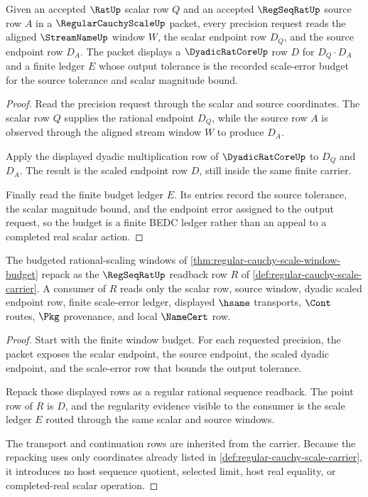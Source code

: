 \begin{theorem}
\label{thm:regular-cauchy-scale-window-budget}
Given an accepted $\RatUp$ scalar row $Q$ and an accepted $\RegSeqRatUp$ source row $A$ in a $\RegularCauchyScaleUp$ packet, every precision request reads the aligned $\StreamNameUp$ window $W$, the scalar endpoint row $D_Q$, and the source endpoint row $D_A$. The packet displays a $\DyadicRatCoreUp$ row $D$ for $D_Q \cdot D_A$ and a finite ledger $E$ whose output tolerance is the recorded scale-error budget for the source tolerance and scalar magnitude bound.
\end{theorem}
\begin{proof}
Read the precision request through the scalar and source coordinates. The scalar row $Q$ supplies the rational endpoint $D_Q$, while the source row $A$ is observed through the aligned stream window $W$ to produce $D_A$.

Apply the displayed dyadic multiplication row of $\DyadicRatCoreUp$ to $D_Q$ and $D_A$. The result is the scaled endpoint row $D$, still inside the same finite carrier.

Finally read the finite budget ledger $E$. Its entries record the source tolerance, the scalar magnitude bound, and the endpoint error assigned to the output request, so the budget is a finite BEDC ledger rather than an appeal to a completed real scalar action.
\end{proof}

\begin{theorem}
\label{thm:regular-cauchy-scale-regseqrat-handoff}
The budgeted rational-scaling windows of \autoref{thm:regular-cauchy-scale-window-budget} repack as the $\RegSeqRatUp$ readback row $R$ of \autoref{def:regular-cauchy-scale-carrier}. A consumer of $R$ reads only the scalar row, source window, dyadic scaled endpoint row, finite scale-error ledger, displayed $\hsame$ transports, $\Cont$ routes, $\Pkg$ provenance, and local $\NameCert$ row.
\end{theorem}
\begin{proof}
Start with the finite window budget. For each requested precision, the packet exposes the scalar endpoint, the source endpoint, the scaled dyadic endpoint, and the scale-error row that bounds the output tolerance.

Repack those displayed rows as a regular rational sequence readback. The point row of $R$ is $D$, and the regularity evidence visible to the consumer is the scale ledger $E$ routed through the same scalar and source windows.

The transport and continuation rows are inherited from the carrier. Because the repacking uses only coordinates already listed in \autoref{def:regular-cauchy-scale-carrier}, it introduces no host sequence quotient, selected limit, host real equality, or completed-real scalar operation.
\end{proof}

